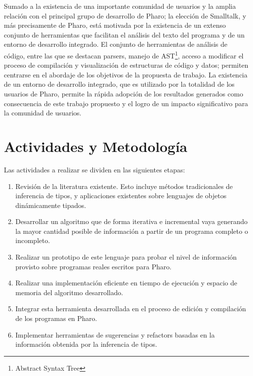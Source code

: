 \documentclass[a4paper,10pt]{article}
\begin{document}
Sumado a la existencia de una importante comunidad de usuarios y la amplia relación con el principal grupo de desarrollo de Pharo; la elección de Smalltalk, y más precisamente de Pharo, está motivada por la existencia de un extenso conjunto de herramientas que facilitan el análisis del texto del programa y de un entorno de desarrollo integrado.
El conjunto de herramientas de análisis de código, entre las que se destacan parsers, manejo de AST\footnote{Abstract Syntax Tree}, acceso a modificar el proceso de compilación y visualización de estructuras de código y datos; permiten centrarse en el abordaje de los objetivos de la propuesta de trabajo. 
La existencia de un entorno de desarrollo integrado, que es utilizado por la totalidad de los usuarios de Pharo, permite la rápida adopción de los resultados generados como consecuencia de este trabajo propuesto y el logro de un impacto significativo para la comunidad de usuarios.


\section{Actividades y Metodología}

Las actividades a realizar se dividen en las siguientes etapas:

  \begin{enumerate}
   \item Revisión de la literatura existente. Esto incluye métodos tradicionales de inferencia de tipos, y aplicaciones existentes sobre lenguajes de objetos dinámicamente tipados.
   \item Desarrollar un algoritmo que de forma iterativa e incremental vaya generando la mayor cantidad posible de información a partir de un programa completo o incompleto.
   \item Realizar un prototipo de este lenguaje para probar el nivel de información provisto sobre programas reales escritos para Pharo.
   \item Realizar una implementación eficiente en tiempo de ejecución y espacio de memoria del algoritmo desarrollado.
   \item Integrar esta herramienta desarrollada en el proceso de edición y compilación de los programas en Pharo.
   \item Implementar herramientas de sugerencias y refactors basadas en la información obtenida por la inferencia de tipos.
  \end{enumerate}
\end{document}
